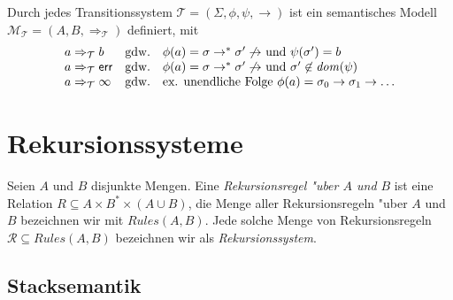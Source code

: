 \documentclass[12pt,a4paper,final]{article}
\begin{document}
\begin{definition}
  Durch jedes Transitionssystem \mbox{$\mathcal{T} = (\Sigma,\phi,\psi,\rightarrow)$} ist ein
  semantisches Modell \mbox{$\mathcal{M}_{\mathcal{T}} = (A,B,\Rightarrow_{\mathcal{T}})$} definiert,
  mit
  \[\begin{array}{lcl}
    a \Rightarrow_{\mathcal{T}} b
    & \text{gdw.} &
    \text{$\phi(a) = \sigma \rightarrow^* \sigma' \not\rightarrow$ und $\psi(\sigma') = b$} \\
    a \Rightarrow_{\mathcal{T}} \mathsf{err}
    & \text{gdw.} &
    \text{$\phi(a) = \sigma \rightarrow^* \sigma' \not\rightarrow$ und $\sigma' \not\in \operatorname{\mathit{dom}}(\psi)$} \\
    a \Rightarrow_{\mathcal{T}} \infty
    & \text{gdw.} &
    \text{ex. unendliche Folge $\phi(a) = \sigma_0 \rightarrow \sigma_1 \rightarrow \ldots$}
  \end{array}\]
\end{definition}



\section{Rekursionssysteme}
\label{sec:Rekursionssysteme}

\begin{definition}
  Seien $A$ und $B$ disjunkte Mengen.
  Eine \emph{Rekursionsregel "uber $A$ und $B$} ist eine Relation
  \mbox{$R \subseteq A \times B^* \times (A \cup B)$}, die Menge aller Rekursionsregeln
  "uber $A$ und $B$ bezeichnen wir mit \mbox{$\mathit{Rules}(A,B)$}.
  Jede solche Menge von Rekursionsregeln \mbox{$\mathcal{R} \subseteq \mathit{Rules}(A,B)$}
  bezeichnen wir als \emph{Rekursionssystem}.
\end{definition}



\subsection{Stacksemantik}
\label{sec:Stacksemantik}
\end{document}
